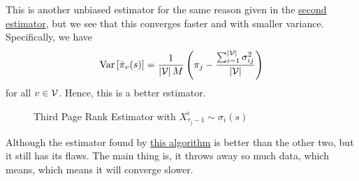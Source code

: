 This is another unbiased estimator for the same reason given in the \hyperref[subsec:second-page-rank-estimator]{second estimator}, but we see that this converges faster and with smaller variance. Specifically, we have
\[
	\mathop{\mathrm{Var}}\left[\hat{\pi}_v(s) \right]  = \frac{1}{\left\vert \mathcal{\MakeUppercase{v}}  \right\vert M}\left(\pi_{j} - \frac{\sum_{i=1}^{\left\vert \mathcal{\MakeUppercase{v}}  \right\vert} \sigma_{ij}^2}{\left\vert \mathcal{\MakeUppercase{v}}  \right\vert}\right)
\]
for all \(v\in \mathcal{\MakeUppercase{v}} \). Hence, this is a better estimator.

\begin{figure}[H]
	\centering
	\caption{Third Page Rank Estimator with \(X^i_{\tau_j - 1}\sim\sigma_i(s)\)}
	\label{fig:Monte-Carlo-Estimator-3}
\end{figure}

\begin{problem}
Although the estimator found by \hyperref[algo:Monte-Carlo-algorithm-3]{this algorithm} is better than the other two, but it still has its flaws.  The main thing is, it throws away so much data, which means, which means it will converge slower.
\end{problem}